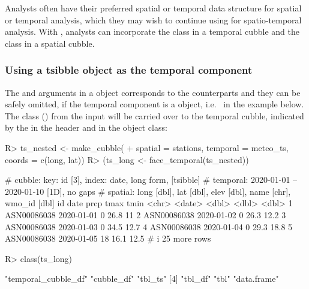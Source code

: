 \documentclass[
  shortnames]{jss}
\begin{document}
Analysts often have their preferred spatial or temporal data structure for spatial or temporal analysis, which they may wish to continue using for spatio-temporal analysis. With , analysts can incorporate the  class \citep{tsibble} in a temporal cubble and the  class \citep{sf} in a spatial cubble.

\hypertarget{using-a-tsibble-object-as-the-temporal-component}{%
\subsubsection{Using a tsibble object as the temporal component}\label{using-a-tsibble-object-as-the-temporal-component}}

The  and  arguments in a  object corresponds to the  counterparts and they can be safely omitted, if the temporal component is a  object, i.e.~ in the example below. The  class () from the input will be carried over to the temporal cubble, indicated by the \code{[tsibble]} in the header and in the object class:

\begin{CodeChunk}
\begin{CodeInput}
R> ts_nested <- make_cubble(
+   spatial = stations, temporal = meteo_ts, coords = c(long, lat))
R> (ts_long <- face_temporal(ts_nested))
\end{CodeInput}
\begin{CodeOutput}
# cubble:   key: id [3], index: date, long form, [tsibble]
# temporal: 2020-01-01 -- 2020-01-10 [1D], no gaps
# spatial:  long [dbl], lat [dbl], elev [dbl], name [chr], wmo_id [dbl]
  id          date        prcp  tmax  tmin
  <chr>       <date>     <dbl> <dbl> <dbl>
1 ASN00086038 2020-01-01     0  26.8  11  
2 ASN00086038 2020-01-02     0  26.3  12.2
3 ASN00086038 2020-01-03     0  34.5  12.7
4 ASN00086038 2020-01-04     0  29.3  18.8
5 ASN00086038 2020-01-05    18  16.1  12.5
# i 25 more rows
\end{CodeOutput}
\begin{CodeInput}
R> class(ts_long)
\end{CodeInput}
\begin{CodeOutput}
[1] "temporal_cubble_df" "cubble_df"          "tbl_ts"            
[4] "tbl_df"             "tbl"                "data.frame"        
\end{CodeOutput}
\end{CodeChunk}
\end{document}
